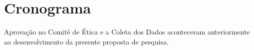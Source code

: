 \documentclass[chapter=TITLE,
               oneside,
               12pt,
               a4paper,
               english,
               brazil]{abntex2}    %
\begin{document}
\section{Cronograma}\label{sec:cronograma}
    \begin{table}[H]
        \caption{Cronograma do Projeto em Meses -- Junho de 2020 à Maio de 2021}
        \begin{threeparttable}
        \renewcommand{\TPTminimum}{\linewidth}
            \begin{tablenotes}
              \footnotesize
              \item Aprovação no Comitê de Ética e a Coleta dos Dados aconteceram
              anteriormente ao desenvolvimento da presente proposta de pesquisa.
            \end{tablenotes}
        \end{threeparttable}
    \end{table}%
\end{document}
